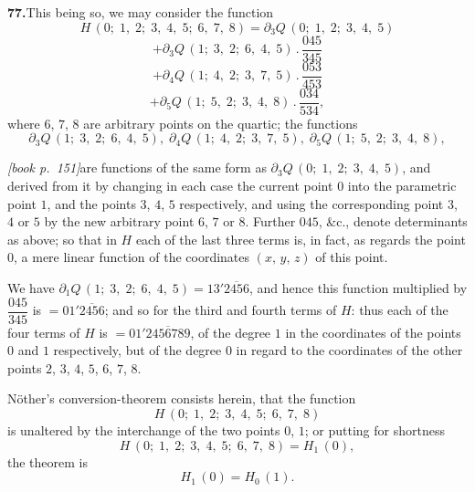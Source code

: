 \documentclass[11pt,a4paper]{article}
\theoremstyle{plain}
\theoremstyle{definition}
\theoremstyle{remark}
\providecommand{\bdet}[1]{\overline{#1}}
\begin{document}
\medskip\noindent\textbf{77.}\quad This being so, we may consider the function
\[
H\,(0;\;1,\;2;\;3,\;4,\;5;\;6,\;7,\;8) = \partial_3 Q\,(0;\;1,\;2;\;3,\;4,\;5)
\]
\[
+ \partial_3 Q\,(1;\;3,\;2;\;6,\;4,\;5)\,.\,\frac{045}{345}
\]
\[
+ \partial_4 Q\,(1;\;4,\;2;\;3,\;7,\;5)\,.\,\frac{053}{453}
\]
\[
+ \partial_5 Q\,(1;\;5,\;2;\;3,\;4,\;8)\,.\,\frac{034}{534},
\]
where $6$, $7$, $8$ are arbitrary points on the quartic; the functions
\[
\partial_3 Q\,(1;\;3,\;2;\;6,\;4,\;5),\;\partial_4 Q\,(1;\;4,\;2;\;3,\;7,\;5),\;\partial_5 Q\,(1;\;5,\;2;\;3,\;4,\;8),
\]

\medskip\noindent\textit{[book p.~151]}\quad are functions of the same form as $\partial_3 Q\,(0;\;1,\;2;\;3,\;4,\;5)$, and derived from it by changing in each case the current point $0$ into the parametric point $1$, and the points $3$, $4$, $5$ respectively, and using the corresponding point $3$, $4$ or $5$ by the new arbitrary point $6$, $7$ or $8$. Further $045$, \&c., denote determinants as above; so that in $H$ each of the last three terms is, in fact, as regards the point $0$, a mere linear function of the coordinates $(x,\,y,\,z)$ of this point.

We have $\partial_1 Q\,(1;\;3,\;2;\;6,\;4,\;5) = 13'\bdet{2456}$, and hence this function multiplied by $\dfrac{045}{345}$ is $= 01'\bdet{2456}$; and so for the third and fourth terms of $H$: thus each of the four terms of $H$ is $= 01'\bdet{2456789}$, of the degree $1$ in the coordinates of the points $0$ and $1$ respectively, but of the degree $0$ in regard to the coordinates of the other points $2$, $3$, $4$, $5$, $6$, $7$, $8$.

Nöther's conversion-theorem consists herein, that the function
\[
H\,(0;\;1,\;2;\;3,\;4,\;5;\;6,\;7,\;8)
\]
is unaltered by the interchange of the two points $0$, $1$; or putting for shortness
\[
H\,(0;\;1,\;2;\;3,\;4,\;5;\;6,\;7,\;8) = H_1\,(0),
\]
the theorem is
\[
H_1\,(0) = H_0\,(1).
\]
\end{document}
